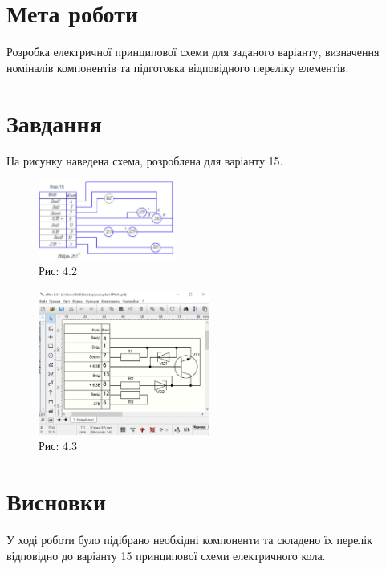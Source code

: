 \documentclass[a4paper]{article}
\begin{document}
\section*{Мета роботи}
Розробка електричної принципової схеми для заданого варіанту, визначення номіналів компонентів та підготовка відповідного переліку елементів.

\section*{Завдання}

На рисунку наведена схема, розроблена для варіанту 15.

\begin{figure}[h]
    \centering
    \includegraphics[width=0.4\textwidth]{imgs/PW4.1.png}
    \caption*{Рис: 4.2}
\end{figure}

\begin{figure}[h]
    \centering
    \includegraphics[width=0.5\textwidth]{imgs/PW4.2.png}
    \caption*{Рис: 4.3}
\end{figure}

\section*{Висновки}
У ході роботи було підібрано необхідні компоненти та складено їх перелік відповідно до варіанту 15 принципової схеми електричного кола.
\end{document}
